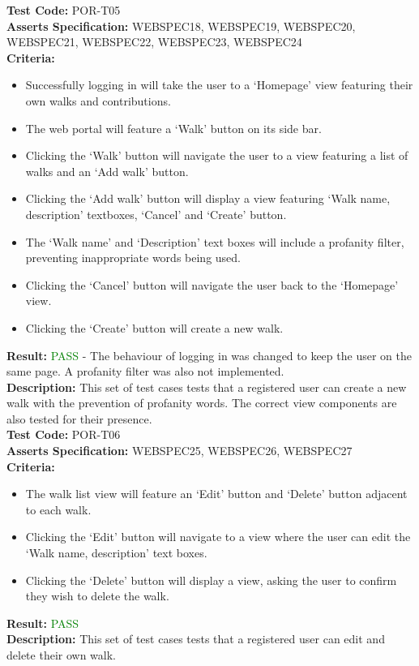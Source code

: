 \documentclass[11pt,a4paper]{report}
\begin{document}
\label{test:POR-T05}
\noindent\textbf{Test Code:} POR-T05\\
\textbf{Asserts Specification:} WEBSPEC18, WEBSPEC19, WEBSPEC20, WEBSPEC21, WEBSPEC22, WEBSPEC23, WEBSPEC24\\ 
\textbf{Criteria:} \begin{itemize}
                     \item Successfully logging in will take the user to a `Homepage' view featuring their own walks and contributions.
                     \item The web portal will feature a `Walk' button on its side bar.
                     \item Clicking the `Walk' button will navigate the user to a view featuring a list of walks and an `Add walk' button.
                     \item Clicking the `Add walk' button will display a view featuring `Walk name, description' textboxes, `Cancel' and `Create' button.
                     \item The `Walk name' and `Description' text boxes will include a profanity filter, preventing inappropriate words being used.
                     \item Clicking the `Cancel' button will navigate the user back to the `Homepage' view.
                     \item Clicking the `Create' button will create a new walk.
                   \end{itemize}  
\textbf{Result:} \textcolor{green}{PASS} - The behaviour of logging in was changed to keep the user on the same page. A profanity filter was also not implemented.\\ 
\textbf{Description:} This set of test cases tests that a registered user can create a new walk with the prevention of profanity words. The correct view components are also tested for their presence. \\

\label{test:POR-T06}
\noindent\textbf{Test Code:} POR-T06\\
\textbf{Asserts Specification:} WEBSPEC25, WEBSPEC26, WEBSPEC27\\ 
\textbf{Criteria:} \begin{itemize}
                     \item The walk list view will feature an `Edit' button and `Delete' button adjacent to each walk.
                     \item Clicking the `Edit' button will navigate to a view where the user can edit the `Walk name, description' text boxes.
                     \item Clicking the `Delete' button will display a view, asking the user to confirm they wish to delete the walk.
                   \end{itemize}  
\textbf{Result:} \textcolor{green}{PASS}\\ 
\textbf{Description:} This set of test cases tests that a registered user can edit and delete their own walk. \\
\end{document}

